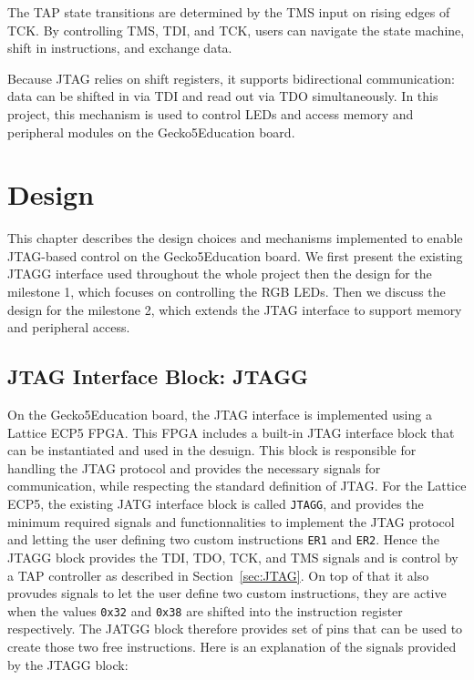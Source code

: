 \documentclass[a4paper,11pt,oneside]{report}
\newcommand{\boardName}{Gecko5Education \xspace}
\begin{document}
The TAP state transitions are determined by the TMS input on rising edges of TCK.  
By controlling TMS, TDI, and TCK, users can navigate the state machine,  
shift in instructions, and exchange data.  

Because JTAG relies on shift registers, it supports bidirectional communication:  
data can be shifted in via TDI and read out via TDO simultaneously.  
In this project, this mechanism is used to control LEDs  
and access memory and peripheral modules on the \boardName board.  


\chapter{Design}
This chapter describes the design choices and mechanisms implemented to enable 
JTAG-based control on the \boardName board.  
We first present the existing JTAGG interface used throughout the whole project then the design for the milestone 1, which focuses on controlling the RGB LEDs.  
Then we discuss the design for the milestone 2, which extends the JTAG interface to support memory and peripheral access.  

\section{JTAG Interface Block: JTAGG}

On the \boardName board, the JTAG interface is implemented using a Lattice ECP5 FPGA. This FPGA includes a built-in JTAG interface block that 
can be instantiated and used in the desuign. This block is responsible for handling the JTAG protocol and provides the necessary signals for communication,
while respecting the standard definition of JTAG.
For the Lattice ECP5, the existing JATG interface block is called \texttt{JTAGG}, and provides the minimum required signals and 
functionnalities to implement the JTAG protocol and letting the user defining two custom instructions \texttt{ER1} and \texttt{ER2}.
Hence the JTAGG block provides the TDI, TDO, TCK, and TMS signals and is control by a TAP controller as described in Section~\ref{sec:JTAG}.
On top of that it also provudes signals to let the user define two custom instructions, they are active when the values \texttt{0x32} and \texttt{0x38} are shifted into the instruction register respectively.
The JATGG block therefore provides set of pins that can be used to create those two free instructions.
Here is an explanation of the signals provided by the JTAGG block:
\end{document}
